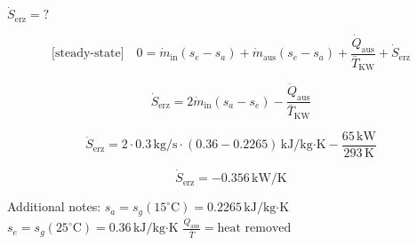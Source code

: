 \( \dot{S}_{\text{erz}} = ? \)  

\[ 
\text{[steady-state]} \quad 0 = \dot{m}_{\text{in}} (s_e - s_a) + \dot{m}_{\text{aus}} (s_e - s_a) + \frac{\dot{Q}_{\text{aus}}}{\bar{T}_{\text{KW}}} + \dot{S}_{\text{erz}} 
\]  

\[ 
\dot{S}_{\text{erz}} = 2 \dot{m}_{\text{in}} (s_a - s_e) - \frac{\dot{Q}_{\text{aus}}}{\bar{T}_{\text{KW}}} 
\]  

\[ 
\dot{S}_{\text{erz}} = 2 \cdot 0.3 \, \text{kg/s} \cdot (0.36 - 0.2265) \, \text{kJ/kg·K} - \frac{65 \, \text{kW}}{293 \, \text{K}} 
\]  

\[ 
\dot{S}_{\text{erz}} = -0.356 \, \text{kW/K} 
\]  

Additional notes:  
\( s_a = s_g (15^\circ \text{C}) = 0.2265 \, \text{kJ/kg·K} \)  
\( s_e = s_g (25^\circ \text{C}) = 0.36 \, \text{kJ/kg·K} \)  
\( \frac{\dot{Q}_{\text{aus}}}{\bar{T}} = \text{heat removed} \)